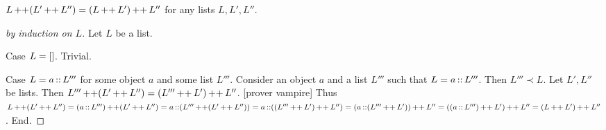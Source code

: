 \documentclass[10pt]{article}
\begin{document}
  \begin{forthel}
    \begin{proposition}[id=LISTS_CONCAT_1021563255448756,printid]
      $L \mathop{++} (L' \mathop{++} L'') = (L \mathop{++} L') \mathop{++} L''$ for any lists $L, L', L''$.
    \end{proposition}
    \begin{proof}[by induction on $L$]
      Let $L$ be a list.

      Case $L = []$. Trivial.

      Case $L = a \mathop{::} L'''$ for some object $a$ and some list $L'''$.
        Consider an object $a$ and a list $L'''$ such that $L = a \mathop{::} L'''$.
        Then $L''' \prec L$.
        Let $L',L''$ be lists.
        Then $L''' \mathop{++} (L' \mathop{++} L'') = (L''' \mathop{++} L') \mathop{++} L''$.
        [prover vampire]
        Thus $L \mathop{++} (L' \mathop{++} L'') 
          = (a \mathop{::} L''') \mathop{++} (L' \mathop{++} L'')
          = a \mathop{::} (L''' \mathop{++} (L' \mathop{++} L''))
          = a \mathop{::} ((L''' \mathop{++} L') \mathop{++} L'')
          = (a \mathop{::} (L''' \mathop{++} L')) \mathop{++} L''
          = ((a \mathop{::} L''') \mathop{++} L') \mathop{++} L''
          = (L \mathop{++} L') \mathop{++} L''$.
      End.
    \end{proof}
  \end{forthel}
\end{document}
